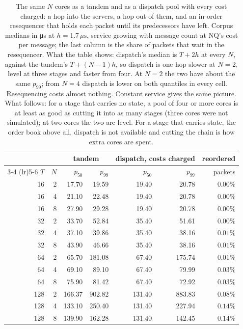 \documentclass[11pt]{article}
\begin{document}
\begin{table}[tbp]
\centering
\small
\begin{tabular}{@{}rr rr rr r@{}}
\toprule
 & & \multicolumn{2}{c}{tandem} & \multicolumn{2}{c}{dispatch, costs charged} & reordered \\
\cmidrule(lr){3-4} \cmidrule(lr){5-6}
$T$ & $N$ & $p_{50}$ & $p_{99}$ & $p_{50}$ & $p_{99}$ & packets \\
\midrule
 16 & 2 &  17.70 &  19.59 &  19.40 &  20.78 & $0.00\%$ \\
 16 & 4 &  21.10 &  22.48 &  19.40 &  20.78 & $0.00\%$ \\
 16 & 8 &  27.90 &  29.28 &  19.40 &  20.78 & $0.00\%$ \\
\midrule
 32 & 2 &  33.70 &  52.84 &  35.40 &  51.61 & $0.00\%$ \\
 32 & 4 &  37.10 &  39.86 &  35.40 &  38.16 & $0.01\%$ \\
 32 & 8 &  43.90 &  46.66 &  35.40 &  38.16 & $0.01\%$ \\
\midrule
 64 & 2 &  65.70 & 181.08 &  67.40 & 175.74 & $0.01\%$ \\
 64 & 4 &  69.10 &  89.10 &  67.40 &  79.99 & $0.03\%$ \\
 64 & 8 &  75.90 &  81.42 &  67.40 &  72.92 & $0.03\%$ \\
\midrule
128 & 2 & 166.37 & 902.82 & 131.40 & 883.83 & $0.08\%$ \\
128 & 4 & 133.10 & 250.40 & 131.40 & 227.94 & $0.14\%$ \\
128 & 8 & 139.90 & 162.28 & 131.40 & 142.45 & $0.14\%$ \\
\bottomrule
\end{tabular}
\caption{The same $N$ cores as a tandem and as a dispatch pool with every cost charged: a hop
into the servers, a hop out of them, and an in-order resequencer that holds each packet
until its predecessors have left. Corpus medians in \si{\micro\second} at
$h = 1.7\,\mu\mathrm{s}$, service growing with message count at NQ's cost per message;
the last column is the share of packets that wait in the resequencer. What the table
shows: dispatch's median is $T + 2h$ at every $N$, against the tandem's $T + (N-1)h$, so
dispatch is one hop slower at $N = 2$, level at three stages and faster from four. At
$N = 2$ the two have about the same $p_{99}$; from $N = 4$ dispatch is lower on both
quantiles in every cell. Resequencing costs almost nothing. Constant service gives the
same picture. What follows: for a stage that carries no state, a pool of four or more
cores is at least as good as cutting it into as many stages (three cores were not
simulated); at two cores the two are level. For a stage that carries state, the order
book above all, dispatch is not available and cutting the chain is how extra cores are
spent.}
\label{tab:dispatch-costed}
\end{table}
\end{document}

